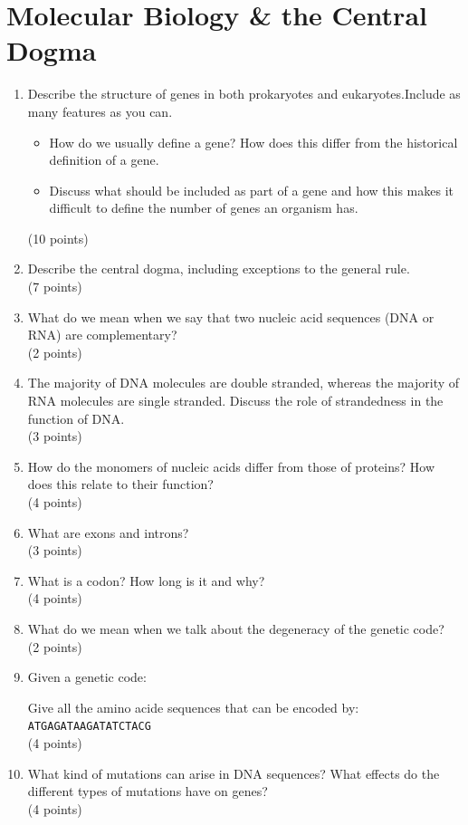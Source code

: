 \documentclass[11pt]{article}
\begin{document}
\section{Molecular Biology \& the Central Dogma}  
\begin{enumerate}
\item Describe the structure of genes in both prokaryotes and
  eukaryotes.Include as many features as you can.
  \begin{itemize}
  \item How do we usually define a gene? How does this differ
    from the historical definition of a gene.
  \item Discuss what should be included as part of a gene
    and how this makes it difficult to define the number of genes an organism
    has.
  \end{itemize}
  (10 points)
\item Describe the central dogma, including exceptions to the general rule.\\
  (7 points)
\item What do we mean when we say that two nucleic acid sequences (DNA or RNA) are
  complementary?\\
  (2 points)
\item The majority of DNA molecules are double stranded, whereas the majority of
  RNA molecules are single stranded. Discuss the role of strandedness in the
  function of DNA.\\
  (3 points)
\item How do the monomers of nucleic acids differ from those of proteins? How
  does this relate to their function?\\
(4 points)
\item What are exons and introns?\\
(3 points)
\item What is a codon? How long is it and why?\\
(4 points)
\item What do we mean when we talk about the degeneracy of the genetic code?\\
(2 points)
\item Given a genetic code:\\
  \begin{minipage}{0.6\textwidth}
  {\tiny
    
  }
  \end{minipage}

  Give all the amino acide sequences that can be encoded by:\\
  \verb|ATGAGATAAGATATCTACG|\\
  (4 points)
\item What kind of mutations can arise in DNA sequences? What effects
  do the different types of mutations have on genes?\\
  (4 points)
\end{enumerate}  
\end{document}
